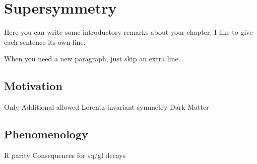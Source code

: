 

\chapter[Supersymmetry][Top of Page Title]{Supersymmetry}

Here you can write some introductory remarks about your chapter.
I like to give each sentence its own line.

When you need a new paragraph, just skip an extra line.

\section{Motivation}

Only Additional allowed Lorentz invariant symmetry
Dark Matter

\section{Phenomenology}

R parity
Consequences for sq/gl decays
